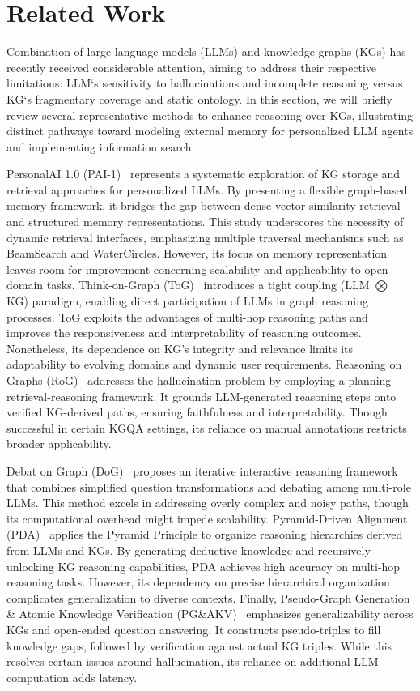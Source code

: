 \section{Related Work}

Combination of large language models (LLMs) and knowledge graphs (KGs) has recently received considerable attention, aiming to address their respective limitations: LLM`s sensitivity to hallucinations and incomplete reasoning versus KG`s fragmentary coverage and static ontology. In this section, we will briefly review several representative methods to enhance reasoning over KGs, illustrating distinct pathways toward modeling external memory for personalized LLM agents and implementing information search.

PersonalAI 1.0 (PAI-1)~\cite{11479299} represents a systematic exploration of KG storage and retrieval approaches for personalized LLMs. By presenting a flexible graph-based memory framework, it bridges the gap between dense vector similarity retrieval and structured memory representations. This study underscores the necessity of dynamic retrieval interfaces, emphasizing multiple traversal mechanisms such as BeamSearch and WaterCircles. However, its focus on memory representation leaves room for improvement concerning scalability and applicability to open-domain tasks. Think-on-Graph (ToG)~\cite{DBLP:conf/iclr/SunXTW0GNSG24} introduces a tight coupling (LLM $\bigotimes$ KG) paradigm, enabling direct participation of LLMs in graph reasoning processes. ToG exploits the advantages of multi-hop reasoning paths and improves the responsiveness and interpretability of reasoning outcomes. Nonetheless, its dependence on KG's integrity and relevance limits its adaptability to evolving domains and dynamic user requirements.  Reasoning on Graphs (RoG)~\cite{luo2024rog} addresses the hallucination problem by employing a planning-retrieval-reasoning framework. It grounds LLM-generated reasoning steps onto verified KG-derived paths, ensuring faithfulness and interpretability. Though successful in certain KGQA settings, its reliance on manual annotations restricts broader applicability. 

Debat on Graph (DoG)~\cite{ma2025debate} proposes an iterative interactive reasoning framework that combines simplified question transformations and debating among multi-role LLMs. This method excels in addressing overly complex and noisy paths, though its computational overhead might impede scalability. Pyramid-Driven Alignment (PDA)~\cite{Li2024AnEP} applies the Pyramid Principle to organize reasoning hierarchies derived from LLMs and KGs. By generating deductive knowledge and recursively unlocking KG reasoning capabilities, PDA achieves high accuracy on multi-hop reasoning tasks. However, its dependency on precise hierarchical organization complicates generalization to diverse contexts. Finally, Pseudo-Graph Generation \& Atomic Knowledge Verification (PG\&AKV)~\cite{PGAKV2025} emphasizes generalizability across KGs and open-ended question answering. It constructs pseudo-triples to fill knowledge gaps, followed by verification against actual KG triples. While this resolves certain issues around hallucination, its reliance on additional LLM computation adds latency.

